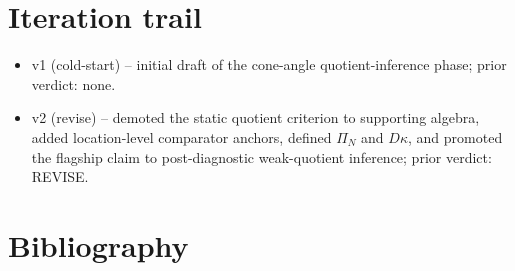 \documentclass[11pt]{article}
\theoremstyle{definition}
\theoremstyle{plain}
\theoremstyle{remark}
\begin{document}
\section{Iteration trail}
\begin{itemize}[leftmargin=*]
\item v1 (cold-start) -- initial draft of the cone-angle quotient-inference phase; prior verdict: none.
\item v2 (revise) -- demoted the static quotient criterion to supporting algebra, added location-level comparator anchors, defined \(\Pi_N\) and \(D\kappa\), and promoted the flagship claim to post-diagnostic weak-quotient inference; prior verdict: REVISE.
\end{itemize}

\section*{Bibliography}
\end{document}

